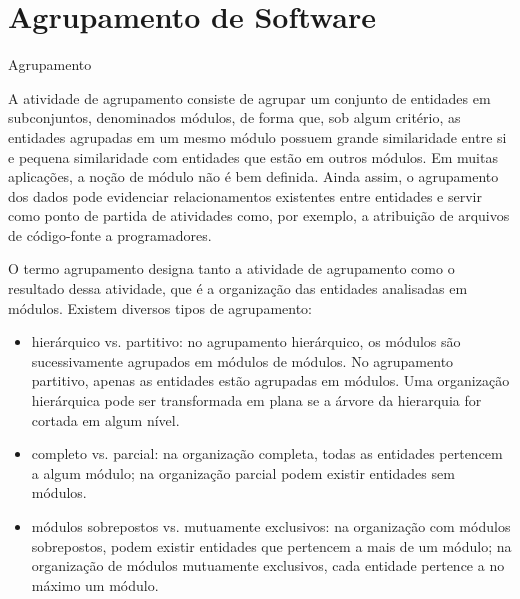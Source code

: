 %
% 

\chapter{Agrupamento de Software}

\begin{section}{Agrupamento}

A atividade de agrupamento consiste de agrupar um conjunto de entidades em subconjuntos, denominados módulos, de forma que, sob algum critério, as entidades agrupadas em um mesmo módulo possuem grande similaridade entre si e pequena similaridade com entidades que estão em outros módulos. Em muitas aplicações, a noção de módulo não é bem definida. Ainda assim, o agrupamento dos dados pode evidenciar relacionamentos existentes entre entidades e servir como ponto de partida de atividades como, por exemplo, a atribuição de arquivos de código-fonte a programadores.

O termo agrupamento designa tanto a atividade de agrupamento como o resultado dessa atividade, que é a organização das entidades analisadas em módulos. Existem diversos tipos de agrupamento:

\begin{itemize}
	\item hierárquico vs. partitivo: no agrupamento hierárquico, os módulos são sucessivamente agrupados em módulos de módulos. No agrupamento partitivo, apenas as entidades estão agrupadas em módulos. Uma organização hierárquica pode ser transformada em plana se a árvore da hierarquia for cortada em algum nível.

	\item completo vs. parcial: na organização completa, todas as entidades pertencem a algum módulo; na organização parcial podem existir entidades sem módulos.

	\item módulos sobrepostos vs. mutuamente exclusivos: na organização com módulos sobrepostos, podem existir entidades que pertencem a mais de um módulo; na organização de módulos mutuamente exclusivos, cada entidade pertence a no máximo um módulo.
\end{itemize}


\end{section}
